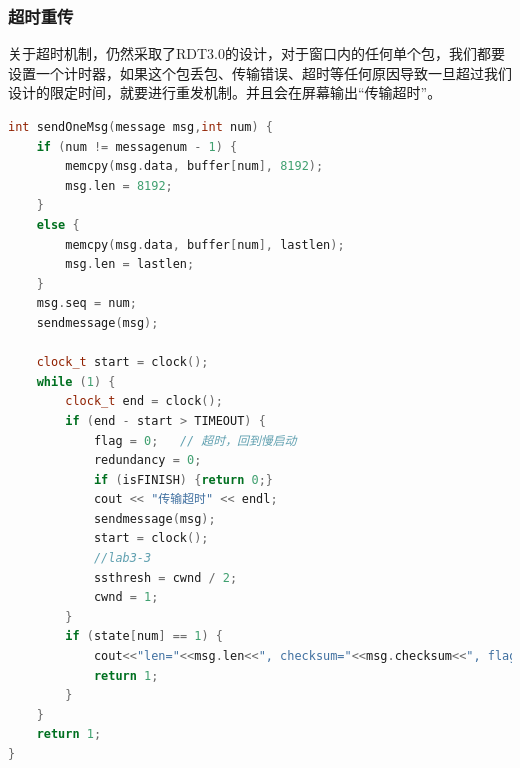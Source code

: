 \documentclass[UTF8,a4paper,10pt]{ctexart}
\begin{document}
\subsubsection{超时重传}
关于超时机制，仍然采取了RDT3.0的设计，对于窗口内的任何单个包，我们都要设置一个计时器，如果这个包丢包、传输错误、超时等任何原因导致一旦超过我们设计的限定时间，就要进行重发机制。并且会在屏幕输出“传输超时”。
\begin{lstlisting}[title=超时重传,frame=trbl,language={C++}]
int sendOneMsg(message msg,int num) {
    if (num != messagenum - 1) {
        memcpy(msg.data, buffer[num], 8192);
        msg.len = 8192;
    }
    else {
        memcpy(msg.data, buffer[num], lastlen);
        msg.len = lastlen;
    }
    msg.seq = num;
    sendmessage(msg);

    clock_t start = clock();
    while (1) {
        clock_t end = clock();
        if (end - start > TIMEOUT) {
            flag = 0;   // 超时，回到慢启动
            redundancy = 0;
            if (isFINISH) {return 0;}
            cout << "传输超时" << endl;
            sendmessage(msg);
            start = clock();
            //lab3-3
            ssthresh = cwnd / 2;
            cwnd = 1;
        }
        if (state[num] == 1) {
            cout<<"len="<<msg.len<<", checksum="<<msg.checksum<<", flag="<<msg.flag<<", seq="<<msg.seq<<endl;
            return 1;
        }
    }
    return 1;
}
\end{lstlisting}
\end{document}
